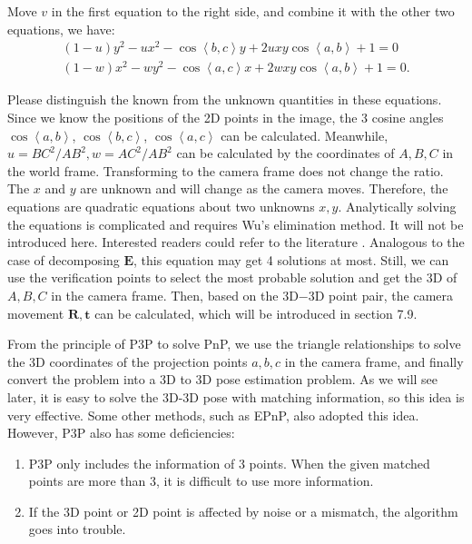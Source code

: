 Move $v$ in the first equation to the right side, and combine it with the other two equations, we have:
\begin{equation}
\begin{array}{l}
\left( {1 - u} \right){y^2} - u{x^2} - \cos \left\langle b,c \right \rangle y + 2uxy\cos \left\langle a,b \right \rangle  + 1 = 0 \\
\left( {1 - w} \right){x^2} - w{y^2} - \cos \left\langle a,c \right \rangle x + 2wxy\cos \left\langle a,b \right \rangle  + 1 = 0.
\end{array}
\end{equation}

Please distinguish the known from the unknown quantities in these equations. Since we know the positions of the 2D points in the image, the 3 cosine angles $\cos \left \langle a,b \right \rangle$, $\cos \left\langle b,c \right \rangle$, $\cos \left \langle a,c \right \rangle$ can be calculated. Meanwhile, $u=BC^2/AB^2, w=AC^2/AB^2$ can be calculated by the coordinates of $A, B, C$ in the world frame. Transforming to the camera frame does not change the ratio. The $x$ and $y$ are unknown and will change as the camera moves. Therefore, the equations are quadratic equations about two unknowns $x, y$. Analytically solving the equations is complicated and requires Wu's elimination method. It will not be introduced here. Interested readers could refer to the literature \cite{GaoHouTangEtAl2003}. Analogous to the case of decomposing $\mathbf{E}$, this equation may get 4 solutions at most. Still, we can use the verification points to select the most probable solution and get the 3D of $A, B, C$ in the camera frame. Then, based on the 3D−3D point pair, the camera movement $\mathbf{R}, \mathbf{t}$ can be calculated, which will be introduced in section 7.9.

From the principle of P3P to solve PnP, we use the triangle relationships to solve the 3D coordinates of the projection points $a, b, c$ in the camera frame, and finally convert the problem into a 3D to 3D pose estimation problem. As we will see later, it is easy to solve the 3D-3D pose with matching information, so this idea is very effective. Some other methods, such as EPnP, also adopted this idea. However, P3P also has some deficiencies:

\begin{enumerate}
	\item P3P only includes the information of 3 points. When the given matched points are more than 3, it is difficult to use more information.
	\item If the 3D point or 2D point is affected by noise or a mismatch, the algorithm goes into trouble.
\end{enumerate}

